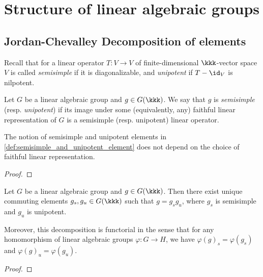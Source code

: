 \section{Structure of linear algebraic groups}


\subsection{Jordan-Chevalley Decomposition of elements}

    Recall that for a linear operator \(T:V \to V\) of finite-dimensional \(\kkk\)-vector space \(V\) is called \emph{semisimple} if it is diagonalizable, and \emph{unipotent} if \(T-\id_V\) is nilpotent.

    \begin{definition}\label{def:semisimple_and_unipotent_element}
        Let \(G\) be a linear algebraic group and \(g \in G(\kkk)\). 
        We say that \(g\) is \emph{semisimple} (resp. \emph{unipotent}) if its image under some (equivalently, any) faithful linear representation of \(G\) is a semisimple (resp. unipotent) linear operator.
    \end{definition}

    \begin{lemma}\label{lem:semisimple_and_unipotent_elements_do_not_depend_on_faithful_representation}
        The notion of semisimple and unipotent elements in \cref{def:semisimple_and_unipotent_element} does not depend on the choice of faithful linear representation.
    \end{lemma}
    \begin{proof}
    \end{proof}

    \begin{theorem}\label{thm:jordan_chevalley_decomposition}
        Let \(G\) be a linear algebraic group and \(g \in G(\kkk)\). 
        Then there exist unique commuting elements \(g_s, g_u \in G(\kkk)\) such that \(g = g_s g_u\), where \(g_s\) is semisimple and \(g_u\) is unipotent.

        Moreover, this decomposition is functorial in the sense that for any homomorphism of linear algebraic groups \(\varphi: G \to H\), we have \(\varphi(g)_s = \varphi(g_s)\) and \(\varphi(g)_u = \varphi(g_u)\).
    \end{theorem}
    \begin{proof}
    \end{proof}



